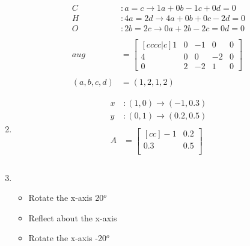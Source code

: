 \documentclass[a4paper,11pt]{article}
\begin{document}
\begin{preview}
\begin{enumerate}
        \begin{align*}
            C&: a=c \rightarrow 1a + 0b - 1c +0d =0\\
            H&: 4a = 2d \rightarrow 4a + 0b + 0c - 2d = 0\\
            O&: 2b = 2c \rightarrow 0a + 2b - 2c = 0d = 0\\\\
            aug &= \begin{bmatrix}[cccc|c]
                1&0&-1&0&0\\ 
                4&0&0&-2&0\\ 
                0&2&-2&1&0
            \end{bmatrix}\\\\
            (a,b,c,d) &= (1,2,1,2)
        \end{align*}

        \item

        \begin{align*}
            x&: (1,0) \rightarrow (-1, 0.3)\\
            y&: (0,1) \rightarrow (0.2, 0.5)\\\\
            A &= \begin{bmatrix}[cc]
                -1&0.2\\ 
                0.3&0.5\\ 
            \end{bmatrix}\\\\
        \end{align*}

        \setcounter{enumi}{9}

        \item

        \begin{itemize}
            \item Rotate the x-axis 20$^o$
            \item Reflect about the x-axis
            \item Rotate the x-axis -20$^o$
        \end{itemize}


\end{enumerate}
\end{preview}
\end{document}
